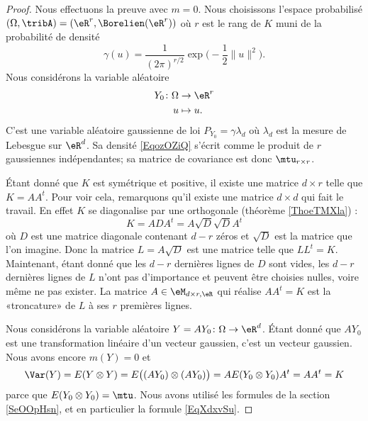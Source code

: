 \begin{proof}
    Nous effectuons la preuve avec \( m=0\). Nous choisissons l'espace probabilisé \( (\Omega,\tribA)=(\eR^r,\Borelien(\eR^r))\) où \( r\) est le rang de \( K\) muni de la probabilité de densité
    \begin{equation}    \label{EqozOZiQ}
        \gamma(u)=\frac{1}{ (2\pi)^{r/2} }\exp\big( -\frac{ 1 }{2}\| u \|^2 \big).
    \end{equation}
    Nous considérons la variable aléatoire
    \begin{equation}
        \begin{aligned}
            Y_0\colon \Omega&\to \eR^r \\
            u&\mapsto u. 
        \end{aligned}
    \end{equation}
    C'est une variable aléatoire gaussienne de loi \( P_{Y_0}=\gamma\lambda_d\) où \( \lambda_d\) est la mesure de Lebesgue sur \( \eR^d\). Sa densité \eqref{EqozOZiQ} s'écrit comme le produit de \( r\) gaussiennes indépendantes; sa matrice de covariance est donc \( \mtu_{r\times r}\).

    Étant donné que \( K\) est symétrique et positive, il existe une matrice \( d\times r\) telle que \( K=AA^t\). Pour voir cela, remarquons qu'il existe une matrice \( d\times d\) qui fait le travail. En effet \( K\) se diagonalise par une orthogonale (théorème \ref{ThoeTMXla}) :
    \begin{equation}
        K=ADA^t=A\sqrt{D}\sqrt{D}A^t
    \end{equation}
    où \( D\) est une matrice diagonale contenant \( d-r\) zéros et \( \sqrt{D}\) est la matrice que l'on imagine. Donc la matrice \( L=A\sqrt{D}\) est une matrice telle que \( LL^t=K\). Maintenant, étant donné que les \( d-r\) dernières lignes de \( D\) sont vides, les \( d-r\) dernières lignes de \( L\) n'ont pas d'importance et peuvent être choisies nulles, voire même ne pas exister. La matrice \( A\in\eM_{d\times r,\eR}\) qui réalise \( AA^t=K\) est la «troncature» de \( L\) à ses \( r\) premières lignes.
    
    Nous considérons la variable aléatoire \( Y=AY_0\colon \Omega\to \eR^d\). Étant donné que \( AY_0\) est une transformation linéaire d'un vecteur gaussien, c'est un vecteur gaussien. Nous avons encore \( m(Y)=0\) et 
    \begin{equation}
        \Var(Y)=E(Y\otimes Y)=E\big( (AY_0)\otimes (AY_0) \big)=AE(Y_0\otimes Y_0)A^t=AA^t=K
    \end{equation}
    parce que \( E(Y_0\otimes Y_0)=\mtu\). Nous avons utilisé les formules de la section \ref{SeOOpHsn}, et en particulier la formule \eqref{EqXdxvSu}.
\end{proof}

